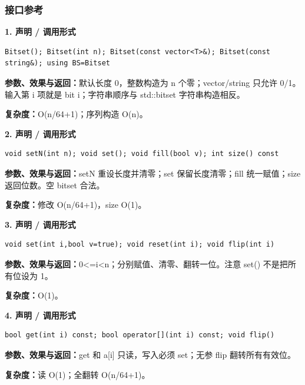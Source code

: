 \documentclass[UTF8,a4paper,10pt]{ctexart}
\begin{document}
\subsubsection*{接口参考}
\noindent\begin{minipage}{\textwidth}
\textbf{1. 声明 / 调用形式}
\begin{lstlisting}
Bitset(); Bitset(int n); Bitset(const vector<T>&); Bitset(const string&); using BS=Bitset
\end{lstlisting}
\textbf{参数、效果与返回：}默认长度 0，整数构造为 n 个零；vector/string 只允许 0/1。输入第 i 项就是 bit i；字符串顺序与 std::bitset 字符串构造相反。

\textbf{复杂度：}O(n/64+1)；序列构造 O(n)。

\end{minipage}\par\vspace{0.4em}
\noindent\begin{minipage}{\textwidth}
\textbf{2. 声明 / 调用形式}
\begin{lstlisting}
void setN(int n); void set(); void fill(bool v); int size() const
\end{lstlisting}
\textbf{参数、效果与返回：}setN 重设长度并清零；set 保留长度清零；fill 统一赋值；size 返回位数。空 bitset 合法。

\textbf{复杂度：}修改 O(n/64+1)，size O(1)。

\end{minipage}\par\vspace{0.4em}
\noindent\begin{minipage}{\textwidth}
\textbf{3. 声明 / 调用形式}
\begin{lstlisting}
void set(int i,bool v=true); void reset(int i); void flip(int i)
\end{lstlisting}
\textbf{参数、效果与返回：}0<=i<n；分别赋值、清零、翻转一位。注意 set() 不是把所有位设为 1。

\textbf{复杂度：}O(1)。

\end{minipage}\par\vspace{0.4em}
\noindent\begin{minipage}{\textwidth}
\textbf{4. 声明 / 调用形式}
\begin{lstlisting}
bool get(int i) const; bool operator[](int i) const; void flip()
\end{lstlisting}
\textbf{参数、效果与返回：}get 和 a[i] 只读，写入必须 set；无参 flip 翻转所有有效位。

\textbf{复杂度：}读 O(1)；全翻转 O(n/64+1)。

\end{minipage}\par\vspace{0.4em}
\end{document}
